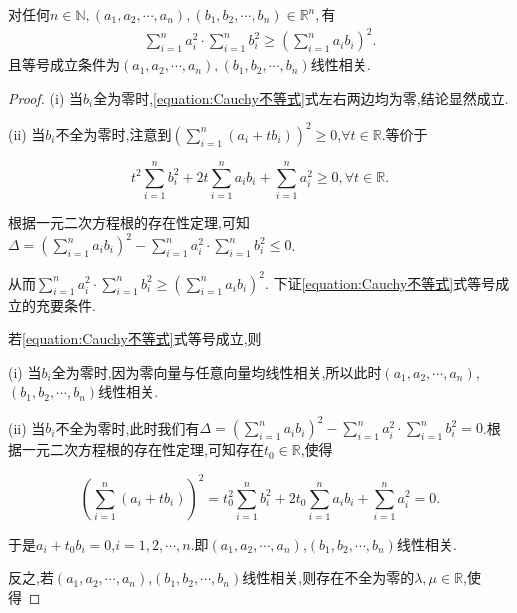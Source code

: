 \documentclass[lang=cn,newtx,10pt,scheme=chinese]{elegantbook}
\begin{document}
\begin{theorem}[Cauchy不等式]\label{theorem:Cauchy不等式}
对任何$n\in \mathbb{N} ,\left( a_1,a_2,\cdots ,a_n \right) ,\left( b_1,b_2,\cdots ,b_n \right) \in \mathbb{R} ^n,$有
\begin{align}\label{equation:Cauchy不等式}
\sum\limits_{i=1}^n{a_{i}^{2}\cdot}\sum\limits_{i=1}^n{b_{i}^{2}}\geqslant \left( \sum\limits_{i=1}^n{a_ib_i} \right) ^2.
\end{align}
且等号成立条件为$\left( a_1,a_2,\cdots ,a_n \right) ,\left( b_1,b_2,\cdots ,b_n \right)$线性相关.
\end{theorem}
\begin{proof}
(i) 当\(b_i\)全为零时,\eqref{equation:Cauchy不等式}式左右两边均为零,结论显然成立.

(ii) 当\(b_i\)不全为零时,注意到\(\left(\sum\limits_{i = 1}^{n}(a_i + tb_i)\right)^2 \geqslant 0\),\(\forall t \in \mathbb{R}\).等价于

\[
t^2\sum\limits_{i = 1}^{n}b_{i}^{2} + 2t\sum\limits_{i = 1}^{n}a_ib_i + \sum\limits_{i = 1}^{n}a_{i}^{2} \geqslant 0,  \forall t \in \mathbb{R}.
\]

根据一元二次方程根的存在性定理,可知\(\Delta = \left(\sum\limits_{i = 1}^{n}a_ib_i\right)^2 - \sum\limits_{i = 1}^{n}a_{i}^{2} \cdot \sum\limits_{i = 1}^{n}b_{i}^{2} \leqslant 0\).

从而\(\sum\limits_{i = 1}^{n}a_{i}^{2} \cdot \sum\limits_{i = 1}^{n}b_{i}^{2} \geqslant \left(\sum\limits_{i = 1}^{n}a_ib_i\right)^2\).
下证\eqref{equation:Cauchy不等式}式等号成立的充要条件.

若\eqref{equation:Cauchy不等式}式等号成立,则

(i) 当\(b_i\)全为零时,因为零向量与任意向量均线性相关,所以此时\((a_1,a_2,\cdots,a_n)\),\((b_1,b_2,\cdots,b_n)\)线性相关.

(ii) 当\(b_i\)不全为零时,此时我们有\(\Delta = \left(\sum\limits_{i = 1}^{n}a_ib_i\right)^2 - \sum\limits_{i = 1}^{n}a_{i}^{2} \cdot \sum\limits_{i = 1}^{n}b_{i}^{2} = 0\).根据一元二次方程根的存在性定理,可知存在\(t_0 \in \mathbb{R}\),使得

\[
\left(\sum\limits_{i = 1}^{n}(a_i + tb_i)\right)^2 = t_{0}^{2}\sum\limits_{i = 1}^{n}b_{i}^{2} + 2t_0\sum\limits_{i = 1}^{n}a_ib_i + \sum\limits_{i = 1}^{n}a_{i}^{2} = 0.
\]

于是\(a_i + t_0b_i = 0\),\(i = 1,2,\cdots,n\).即\((a_1,a_2,\cdots,a_n)\),\((b_1,b_2,\cdots,b_n)\)线性相关.

反之,若\((a_1,a_2,\cdots,a_n)\),\((b_1,b_2,\cdots,b_n)\)线性相关,则存在不全为零的\(\lambda,\mu \in \mathbb{R}\),使得


\end{proof}
\end{document}
